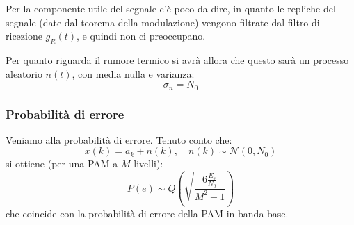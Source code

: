\documentclass[a4paper,11pt]{article}
\begin{document}
Per la componente utile del segnale c'è poco da dire, in quanto le repliche del segnale (date dal teorema della modulazione) vengono filtrate dal filtro di ricezione $g_R(t)$, e quindi non ci preoccupano.

Per quanto riguarda il rumore termico si avrà allora che questo sarà un processo aleatorio $n(t)$, con media nulla e varianza:
$$
\sigma_n = N_0
$$

\subsubsection{Probabilità di errore}
Veniamo alla probabilità di errore. Tenuto conto che:
$$
x(k) = a_k + n(k), \quad n(k) \sim \mathcal{N}(0, N_0)
$$
si ottiene (per una PAM a $M$ livelli):
$$
P(e) \sim Q \left( \sqrt{\frac{6 \frac{E_s}{N_0}}{M^2 - 1}} \right)
$$
che coincide con la probabilità di errore della PAM in banda base.
\end{document}
